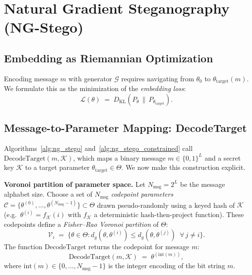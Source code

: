 \documentclass[a4paper,fleqn]{cas-dc}
\newcommand{\calG}{\mathcal{G}}
\newcommand{\DKL}{D_{\mathrm{KL}}}
\begin{document}
\section{Natural Gradient Steganography (NG-Stego)}
\label{sec:natural_gradient}

\subsection{Embedding as Riemannian Optimization}

Encoding message $m$ with generator $\calG$ requires navigating from
$\theta_0$ to $\theta_\mathrm{target}(m)$.
We formulate this as the minimization of the \emph{embedding loss}:
\begin{equation}
  \mathcal{L}(\theta) \;=\; \DKL\!\left(P_\theta \,\|\, P_{\theta_\mathrm{target}}\right).
  \label{eq:embedding_loss}
\end{equation}

\subsection{Message-to-Parameter Mapping: DecodeTarget}
\label{subsec:decodetarget}

Algorithms~\ref{alg:ng_stego} and~\ref{alg:ng_stego_constrained} call
$\mathrm{DecodeTarget}(m, \mathcal{K})$, which maps a binary message
$m\in\{0,1\}^L$ and a secret key $\mathcal{K}$ to a target parameter
$\theta_{\mathrm{target}}\in\Theta$.
We now make this construction explicit.

\noindent\textbf{Voronoi partition of parameter space.}
Let $N_{\mathrm{msg}} = 2^L$ be the message alphabet size.
Choose a set of $N_{\mathrm{msg}}$ \emph{codepoint parameters}
$\mathcal{C} = \{\theta^{(0)}, \ldots, \theta^{(N_{\mathrm{msg}}-1)}\}\subset\Theta$
drawn pseudo-randomly using a keyed hash of $\mathcal{K}$
(e.g.\ $\theta^{(i)} = f_{\mathcal{K}}(i)$ with $f_{\mathcal{K}}$ a
deterministic hash-then-project function).
These codepoints define a \emph{Fisher--Rao Voronoi partition} of $\Theta$:
\[
  \mathcal{V}_i \;=\; \bigl\{\theta\in\Theta : d_g(\theta, \theta^{(i)})
  \leq d_g(\theta, \theta^{(j)})\;\;\forall\, j\neq i\bigr\}.
\]
The function $\mathrm{DecodeTarget}$ returns the codepoint for message $m$:
\[
  \mathrm{DecodeTarget}(m, \mathcal{K})
  \;=\; \theta^{(\mathrm{int}(m))},
\]
where $\mathrm{int}(m)\in\{0,\ldots,N_{\mathrm{msg}}-1\}$ is the integer
encoding of the bit string $m$.
\end{document}
